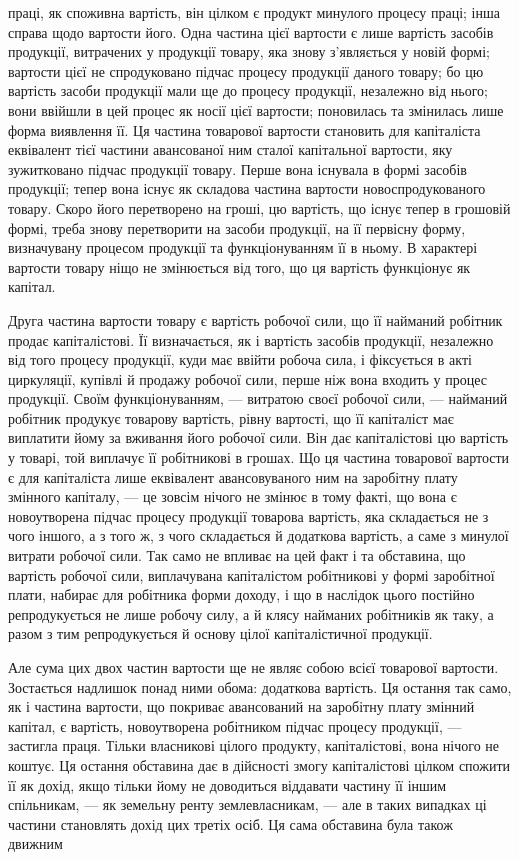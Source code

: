праці, як споживна вартість, він цілком є продукт минулого процесу
праці; інша справа щодо вартости його. Одна частина цієї вартости є
лише вартість засобів продукції, витрачених у продукції товару, яка
знову з’являється у новій формі; вартости цієї не спродуковано підчас
процесу продукції даного товару; бо цю вартість засоби продукції
мали ще до процесу продукції, незалежно від нього; вони ввійшли
в цей процес як носії цієї вартости; поновилась та змінилась лише
форма виявлення її. Ця частина товарової вартости становить для
капіталіста еквівалент тієї частини авансованої ним сталої капітальної
вартости, яку зужитковано підчас продукції товару. Перше вона
існувала в формі засобів продукції; тепер вона існує як складова
частина вартости новоспродукованого товару. Скоро його перетворено на
гроші, цю вартість, що існує тепер в грошовій формі, треба знову перетворити
на засоби продукції, на її первісну форму, визначувану процесом
продукції та функціонуванням її в ньому. В характері вартости
товару ніщо не змінюється від того, що ця вартість функціонує як
капітал.

Друга частина вартости товару є вартість робочої сили, що її найманий
робітник продає капіталістові. Її визначається, як і вартість засобів
продукції, незалежно від того процесу продукції, куди має ввійти
робоча сила, і фіксується в акті циркуляції, купівлі й продажу робочої
сили, перше ніж вона входить у процес продукції. Своїм функціонуванням,
— витратою своєї робочої сили, — найманий робітник продукує товарову
вартість, рівну вартості, що її капіталіст має виплатити йому за
вживання його робочої сили. Він дає капіталістові цю вартість у товарі,
той виплачує її робітникові в грошах. Що ця частина товарової вартости
є для капіталіста лише еквівалент авансовуваного ним на заробітну
плату змінного капіталу, — це зовсім нічого не змінює в тому факті, що
вона є новоутворена підчас процесу продукції товарова вартість, яка
складається не з чого іншого, а з того ж, з чого складається й додаткова
вартість, а саме з минулої витрати робочої сили. Так само не впливає
на цей факт і та обставина, що вартість робочої сили, виплачувана
капіталістом робітникові у формі заробітної плати, набирає для робітника
форми доходу, і що в наслідок цього постійно репродукується не лише
робочу силу, а й клясу найманих робітників як таку, а разом з тим
репродукується й основу цілої капіталістичної продукції.

Але сума цих двох частин вартости ще не являє собою всієї товарової
вартости. Зостається надлишок понад ними обома: додаткова вартість.
Ця остання так само, як і частина вартости, що покриває авансований
на заробітну плату змінний капітал, є вартість, новоутворена робітником
підчас процесу продукції, — застигла праця. Тільки власникові
цілого продукту, капіталістові, вона нічого не коштує. Ця остання обставина
дає в дійсності змогу капіталістові цілком спожити її як дохід, якщо
тільки йому не доводиться віддавати частину її іншим спільникам, — як
земельну ренту землевласникам, — але в таких випадках ці частини становлять
дохід цих третіх осіб. Ця сама обставина була також движним
